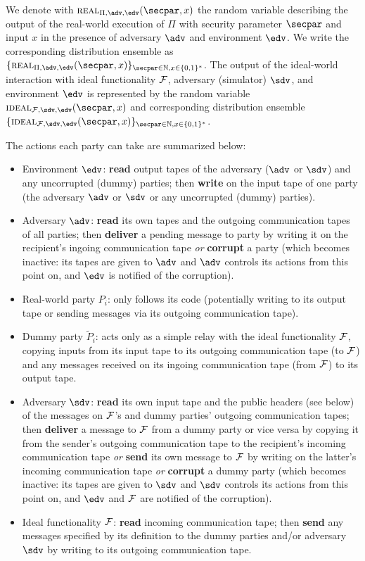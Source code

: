 We denote with $\real_{\Pi,\adv,\env}(\secpar,x)$ the random variable describing the output of the real-world execution of $\Pi$ with security parameter $\secpar$ and input $x$ in the presence of adversary $\adv$ and environment $\env$. We write the corresponding distribution ensemble as $\{ \real_{\Pi,\adv,\env}(\secpar, x) \}_{\secpar \in \mathbb{N}, x \in \{0,1\}^*}$. The output of the ideal-world interaction with ideal functionality $\mathcal{F}$, adversary (simulator) $\Sim$, and environment $\env$ is represented by the random variable $\ideal_{\F,\Sim,\env}(\secpar, x)$ and corresponding distribution ensemble $\{ \ideal_{\F,\Sim,\env}(\secpar, x) \}_{\secpar \in \mathbb{N}, x \in \{0,1\}^*}$.

The actions each party can take are summarized below:
\begin{itemize}
   \item Environment $\env$: \textbf{read} output tapes of the adversary ($\adv$ or $\Sim$) and any uncorrupted (dummy) parties; then \textbf{write} on the input tape of one party (the adversary $\adv$ or $\Sim$ or any uncorrupted (dummy) parties).
   \item Adversary $\adv$: \textbf{read} its own tapes and the outgoing communication tapes of all parties; then \textbf{deliver} a pending message to party by writing it on the recipient's ingoing communication tape \emph{or} \textbf{corrupt} a party (which becomes inactive: its tapes are given to $\adv$ and $\adv$ controls its actions from this point on, and $\env$ is notified of the corruption).
   \item Real-world party $P_i$: only follows its code (potentially writing to its output tape or sending messages via its outgoing communication tape).
   \item Dummy party $\tilde{P}_i$: acts only as a simple relay with the ideal functionality $\mathcal{F}$, copying inputs from its input tape to its outgoing communication tape (to $\mathcal{F}$) and any messages received on its ingoing communication tape (from $\mathcal{F}$) to its output tape.
   \item Adversary $\Sim$: \textbf{read} its own input tape and the public headers (see below) of the messages on $\mathcal{F}$'s and dummy parties' outgoing communication tapes; then \textbf{deliver} a message to $\mathcal{F}$ from a dummy party or vice versa by copying it from the sender's outgoing communication tape to the recipient's incoming communication tape \emph{or} \textbf{send} its own message to $\mathcal{F}$ by writing on the latter's incoming communication tape \emph{or} \textbf{corrupt} a dummy party (which becomes inactive: its tapes are given to $\Sim$ and $\Sim$ controls its actions from this point on, and $\env$ and $\mathcal{F}$ are notified of the corruption).
   \item Ideal functionality $\mathcal{F}$: \textbf{read} incoming communication tape; then \textbf{send} any messages specified by its definition to the dummy parties and/or adversary $\Sim$ by writing to its outgoing communication tape.
\end{itemize}

